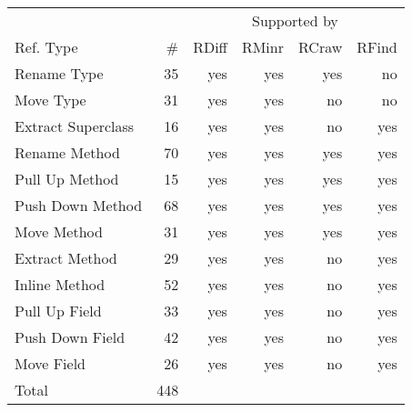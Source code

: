\begin{tabular}{@{}lrrrrr@{}}
\toprule
          & & \multicolumn{4}{c}{Supported by}\\
\cmidrule(lr){3-6}
Ref. Type & \# & RDiff & RMinr & RCraw & RFind\\
\midrule
Rename Type & 35 & yes & yes & yes & no\\
Move Type & 31 & yes & yes & no & no\\
Extract Superclass & 16 & yes & yes & no & yes\\
Rename Method & 70 & yes & yes & yes & yes\\
Pull Up Method & 15 & yes & yes & yes & yes\\
Push Down Method & 68 & yes & yes & yes & yes\\
Move Method  & 31 & yes & yes & yes & yes\\
Extract Method & 29 & yes & yes & no & yes\\
Inline Method & 52 & yes & yes & no & yes\\
Pull Up Field & 33 & yes & yes & no & yes\\
Push Down Field & 42 & yes & yes & no & yes\\
Move Field  & 26 & yes & yes & no & yes\\
\addlinespace
Total  & 448 &  &  &  & \\
\bottomrule
\end{tabular}

